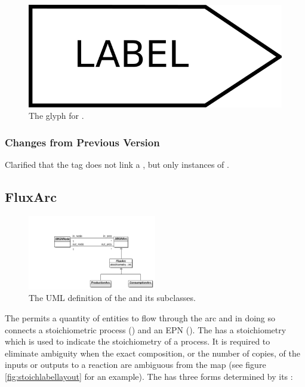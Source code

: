 \begin{figure}[H]
  \centering
  \includegraphics[scale = 0.3]{images/tag}
  \caption{The \PD glyph for .}
  \label{fig:tag}
\end{figure}

\subsubsection{Changes from Previous Version}

Clarified that the tag does not link a , but
only instances of .

\subsection{FluxArc}
\label{defn:FluxArc}

\begin{figure}[htb]
  \centering
  \includegraphics[width = 0.5\textwidth]{images/fluxarcuml}
  \caption{The UML definition of the  and its subclasses.}
  \label{fig:fluxarcuml}
\end{figure}
 
The  permits a quantity of entities to flow through
the arc and in doing so connects a stoichiometric process
() and an EPN
(). The  has a
stoichiometry which is used to indicate the stoichiometry of a
process. It is required to eliminate ambiguity when the exact
composition, or the number of copies, of the inputs or outputs to a
reaction are ambiguous from the map (see figure
\ref{fig:stoichlabellayout} for an example). The 
has three forms determined by its :

